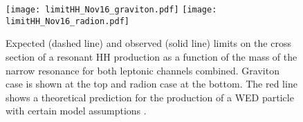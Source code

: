 \begin{figure}[!htb]%
  \begin{center}
    \texttt{[image: limitHH\_Nov16\_graviton.pdf]}
    \texttt{[image: limitHH\_Nov16\_radion.pdf]}
    \caption{ Expected (dashed line) and observed (solid line) limits on the cross section of a resonant HH production
      as a function of the mass of the narrow resonance for both leptonic channels combined. Graviton case is shown at the top and radion case at the bottom. The red line shows a theoretical prediction for
      the production of a WED particle with certain model assumptions \cite{Oliveira:2014kla}.
      }
    \label{fig:HHlimits} %
  \end{center}
\end{figure}




